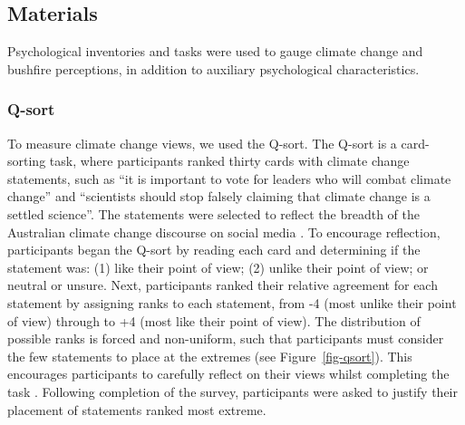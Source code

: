 \documentclass[
  letterpaper,
  DIV=11,
  numbers=noendperiod]{scrartcl}
\begin{document}
\hypertarget{materials}{%
\subsection{Materials}\label{materials}}

Psychological inventories and tasks were used to gauge climate change
and bushfire perceptions, in addition to auxiliary psychological
characteristics.

\hypertarget{q-sort}{%
\subsubsection{Q-sort}\label{q-sort}}

To measure climate change views, we used the Q-sort. The Q-sort is a
card-sorting task, where participants ranked thirty cards with climate
change statements, such as ``it is important to vote for leaders who
will combat climate change'' and ``scientists should stop falsely
claiming that climate change is a settled science''. The statements were
selected to reflect the breadth of the Australian climate change
discourse on social media \citep{andreotta_2022}. To encourage
reflection, participants began the Q-sort by reading each card and
determining if the statement was: (1) like their point of view; (2)
unlike their point of view; or neutral or unsure. Next, participants
ranked their relative agreement for each statement by assigning ranks to
each statement, from -4 (most unlike their point of view) through to +4
(most like their point of view). The distribution of possible ranks is
forced and non-uniform, such that participants must consider the few
statements to place at the extremes (see Figure~\ref{fig-qsort}). This
encourages participants to carefully reflect on their views whilst
completing the task \citep{stephenson1986, brown1980}. Following
completion of the survey, participants were asked to justify their
placement of statements ranked most extreme.
\end{document}
